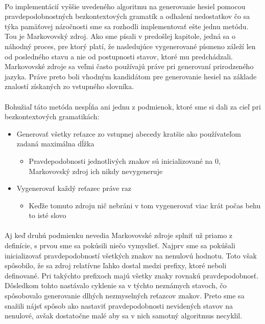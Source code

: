 \paragraph{}
Po implementácií vyššie uvedeného algoritmu na generovanie hesiel pomocou pravdepodobnostných bezkontextových gramatík a odhalení nedostatkov čo sa týka pamäťovej náročnosti sme sa rozhodli implementovať ešte jednu metódu. Tou je Markovovský zdroj. Ako sme písali v predošlej kapitole, jedná sa o náhodný proces, pre ktorý platí, že nasledujúce vygenerované písmeno záleží len od posledného stavu a nie od postupnosti stavov, ktoré mu predchádzali. Markovovské zdroje sa veľmi často používajú práve pri generovaní prirodzeného jazyka. Práve preto boli vhodným kandidátom pre generovanie hesiel na základe znalostí získaných zo vstupného slovníka. 

\paragraph{}
Bohužiaľ táto metóda nespĺňa ani jednu z podmienok, ktoré sme si dali za cieľ pri bezkontextových gramatikách:
\begin{itemize}
	\item Generovať všetky reťazce zo vstupnej abecedy kratšie ako používateľom zadaná maximálna dĺžka
	\begin{itemize}
		\item Pravdepodobnosti jednotlivých znakov sú inicializované na 0, Markovovský zdroj ich nikdy nevygeneruje
	\end{itemize}
	\item Vygenerovať každý reťazec práve raz
	\begin{itemize}
		\item Keďže tomuto zdroju nič nebráni v tom vygenerovať viac krát počas behu to isté slovo
	\end{itemize}
\end{itemize}

\paragraph{}
Aj keď druhú podmienku nevedia Markovovské zdroje splniť už priamo z definície, s prvou sme sa pokúsili niečo vymyslieť. Najprv sme sa pokúšali inicializovať pravdepodobností všetkých znakov na nenulovú hodnotu. Toto však spôsobilo, že sa zdroj relatívne ľahko dostal medzi prefixy, ktoré neboli definované. Pri takýchto prefixoch majú všetky znaky rovnakú pravdepodobnosť. Dôsledkom tohto nastávalo cyklenie sa v týchto neznámych stavoch, čo spôsobovalo generovanie dlhých nezmyselných reťazcov znakov. Preto sme sa snažili nájsť spôsob ako nastaviť pravdepodobnosti nevidených stavov na nenulové, avšak dostatočne malé aby sa v nich samotný algoritmus necyklil.

